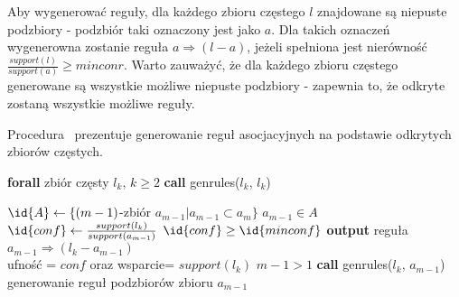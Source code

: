 Aby wygenerować reguły, dla każdego zbioru częstego $l$ znajdowane są niepuste podzbiory - podzbiór taki oznaczony jest jako $a$. Dla takich oznaczeń wygenerowna zostanie reguła $a \Rightarrow (l-a)$, jeżeli spełniona jest nierówność $\frac{support(l)}{support(a)} \geq minconr$. Warto zauważyć, że dla każdego zbioru częstego generowane są wszystkie możliwe niepuste podzbiory - zapewnia to, że odkryte zostaną wszystkie możliwe reguły.

Procedura~ prezentuje generowanie reguł asocjacyjnych na podstawie odkrytych zbiorów częstych.

\begin{codebox}
		\li \textbf{forall} zbiór częsty $l_k$, $k \geq 2$ \Do
			\li \textbf{call} genrules($l_k$, $l_k$)
					\End
		\End
\end{codebox}


\begin{codebox}
		\li $\id{A} \gets \lbrace (m-1)$-zbiór $a_{m-1} | a_{m-1} \subset a_m \rbrace$
		\li \For $a_{m-1} \in A$ \Do
			\li $\id{conf} \gets \frac{support(l_k)}{support(a_{m-1})}$
			\li \If $\id{conf} \geq \id{minconf}$ \Then
						\li \textbf{output} reguła $a_{m-1} \Rightarrow (l_k - a_{m-1})$ \\ ufność = $conf$ oraz wsparcie= $support(l_k)$
						\li \If $m-1 > 1$ \Then
							\li \textbf{call} genrules($l_k$, $a_{m-1}$) \\ generowanie reguł podzbiorów zbioru $a_{m-1}$
						\End
				\End
			\End
		\End
\end{codebox}



 


